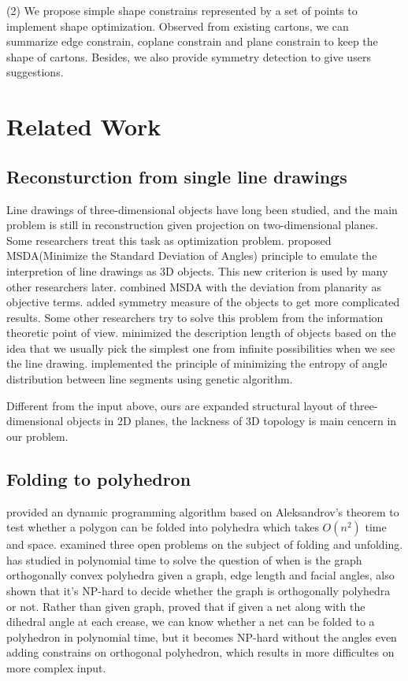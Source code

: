 \documentclass[submission]{gmp2018}
\begin{document}
(2) We propose simple shape constrains represented by a set of points to implement shape optimization. Observed from existing cartons, we can summarize edge constrain, coplane constrain and plane constrain to keep the shape of cartons. Besides, we also provide symmetry detection to give users suggestions. 

\section{Related Work}\label{sec:relatedwork}
\subsection{Reconsturction from single line drawings} 
Line drawings of three-dimensional objects have long been studied, and the main problem is still in reconstruction given projection on two-dimensional planes. Some researchers treat this task as optimization problem. \cite{Marill:1991:EHI:113057.113061} proposed MSDA(Minimize the Standard Deviation of Angles) principle to emulate the interpretion of line drawings as 3D objects. This new criterion is used by many other researchers later. \cite{Leclerc1992An} combined MSDA with the deviation from planarity as objective terms. \cite{Cao:2005:ORS:1097114.1097658} added symmetry measure of the objects to get more complicated results. Some other researchers try to solve this problem from the information theoretic point of view. \cite{Marill1992Why} minimized the description length of objects based on the idea that we usually pick the simplest one from infinite possibilities when we see the line drawing. \cite{Shoji20013} implemented the principle of minimizing the entropy of angle distribution between line segments using genetic algorithm. 

Different from the input above, ours are expanded structural layout of three-dimensional objects in 2D planes, the lackness of 3D topology is main cencern in our problem.

\subsection{Folding to polyhedron}

\cite{Lubiw1996When} provided an dynamic programming algorithm based on Aleksandrov's theorem to test whether a polygon can be folded into polyhedra which takes $O(n^2)$ time and space. \cite{O'Rourke:1998:FUC:646319.686376} examined three open problems on the subject of folding and unfolding. \cite{Biedl2004When} has studied in polynomial time to solve the question of when is the graph  orthogonally convex polyhedra given a graph, edge length and facial angles, also shown that it's NP-hard to decide whether the graph is orthogonally polyhedra or not. Rather than given graph, \cite{Biedl:2005:NFP:1090462.1646553} proved that if given a net along with the dihedral angle at each crease, we can know whether a net can be folded to a polyhedron in polynomial time, but it becomes NP-hard without the angles even adding constrains on orthogonal polyhedron, which results in more difficultes on more complex input.
\end{document}
